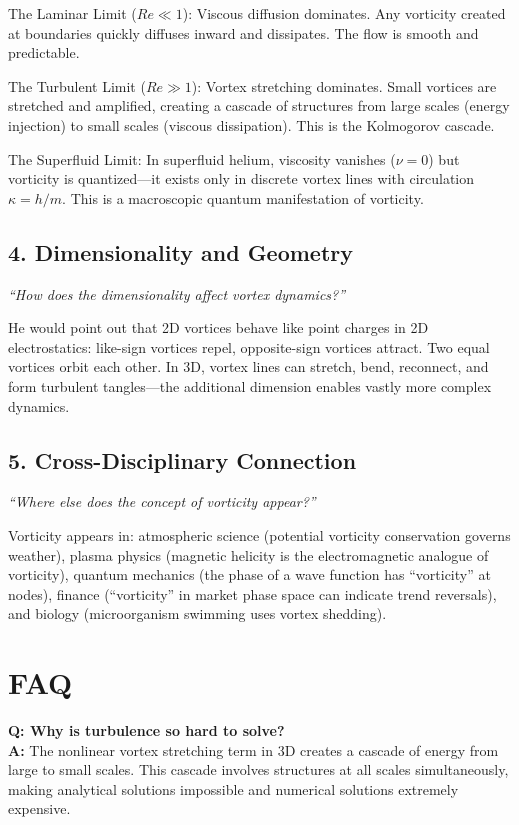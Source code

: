 \documentclass[11pt,openright]{book}
\begin{document}
The Laminar Limit ($Re \ll 1$): Viscous diffusion dominates. Any vorticity created at boundaries quickly diffuses inward and dissipates. The flow is smooth and predictable.

The Turbulent Limit ($Re \gg 1$): Vortex stretching dominates. Small vortices are stretched and amplified, creating a cascade of structures from large scales (energy injection) to small scales (viscous dissipation). This is the Kolmogorov cascade.

The Superfluid Limit: In superfluid helium, viscosity vanishes ($\nu = 0$) but vorticity is quantized---it exists only in discrete vortex lines with circulation $\kappa = h/m$. This is a macroscopic quantum manifestation of vorticity.

\subsection*{4. Dimensionality and Geometry}
\textit{``How does the dimensionality affect vortex dynamics?''}

He would point out that 2D vortices behave like point charges in 2D electrostatics: like-sign vortices repel, opposite-sign vortices attract. Two equal vortices orbit each other. In 3D, vortex lines can stretch, bend, reconnect, and form turbulent tangles---the additional dimension enables vastly more complex dynamics.

\subsection*{5. Cross-Disciplinary Connection}
\textit{``Where else does the concept of vorticity appear?''}

Vorticity appears in: atmospheric science (potential vorticity conservation governs weather), plasma physics (magnetic helicity is the electromagnetic analogue of vorticity), quantum mechanics (the phase of a wave function has ``vorticity'' at nodes), finance (``vorticity'' in market phase space can indicate trend reversals), and biology (microorganism swimming uses vortex shedding).
\section*{FAQ}

\textbf{Q: Why is turbulence so hard to solve?}\\
\textbf{A:} The nonlinear vortex stretching term in 3D creates a cascade of energy from large to small scales. This cascade involves structures at all scales simultaneously, making analytical solutions impossible and numerical solutions extremely expensive.
\end{document}
